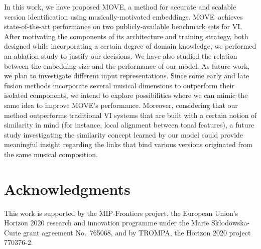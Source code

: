 \documentclass[letterpaper]{article}
\newcommand{\modelname}{MOVE}
\begin{document}
In this work, we have proposed \modelname, a method for accurate and scalable version identification using musically-motivated embeddings. \modelname\ achieves state-of-the-art performance on two publicly-available benchmark sets for VI. After motivating the components of its architecture and training strategy, both designed while incorporating a certain degree of domain knowledge, we performed an ablation study to justify our decisions. We have also studied the relation between the embedding size and the performance of our model. As future work, we plan to investigate different input representations. Since some early and late fusion methods incorporate several musical dimensions to outperform their isolated components, we intend to explore possibilities where we can mimic the same idea to improve \modelname's performance. Moreover, considering that our method outperforms traditional VI systems that are built with a certain notion of similarity in mind (for instance, local alignment between tonal features), a future study investigating the similarity concept learned by our model could provide meaningful insight regarding the links that bind various versions originated from the same musical composition.
 
\section{Acknowledgments}
This work is supported by the MIP-Frontiers project, the European Union's Horizon 2020 research and innovation programme under the Marie Skłodowska-Curie grant agreement No.~765068, and by TROMPA, the Horizon 2020 project 770376-2.

\clearpage


\end{document}
